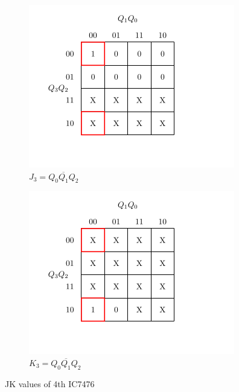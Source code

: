 \documentclass[a4paper,12pt]{article}
\begin{document}
\begin{figure}[H]
    \vspace{0.5cm}

    \begin{subfigure}[b]{0.45\textwidth}
        \centering
        \includegraphics[width=\linewidth]{dec/dj3.png}
        \caption{$J_3=\overline{Q_0Q_1Q_2}$}
    \end{subfigure}
    \hfill
    \begin{subfigure}[b]{0.45\textwidth}
        \centering
        \includegraphics[width=\linewidth]{dec/dk3.png}
        \caption{$K_3=\overline{Q_0Q_1Q_2}$}
    \end{subfigure}

    \caption{JK values of 4th IC7476}
\end{figure}
\end{document}
